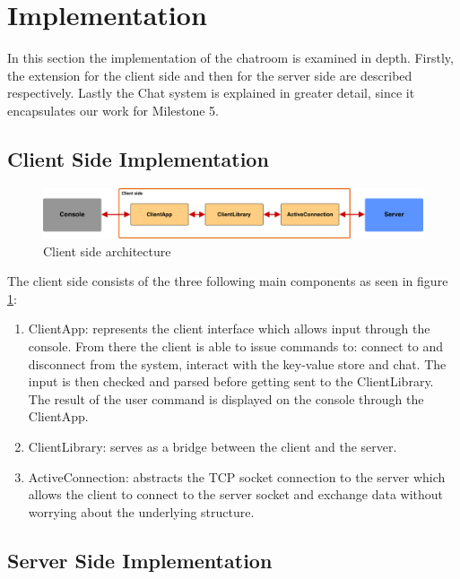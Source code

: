 \section{Implementation}
\label{sec:implementation}

In this section the implementation of the chatroom is examined in depth. Firstly, the extension for the client side and then for the server side are described respectively. Lastly the Chat system is explained in greater detail, since it encapsulates our work for Milestone 5.

\subsection{Client Side Implementation}
\label{sec:Implementation_clintside}

\begin{figure}[h]
	\centering
	\includegraphics[width=\linewidth]{figures/client_arch.png}
	\caption{Client side architecture}
	\label{fig:client_arch}
\end{figure}

The client side consists of the three following main components as seen in figure \ref{fig:client_arch}:
\begin{enumerate} %
  \item ClientApp: represents the client interface which allows input through the console. From there the client is able to issue commands to: connect to and disconnect from the system, interact with the key-value store and chat. The input is then checked and parsed before getting sent to the ClientLibrary. The result of the user command is displayed on the console through the ClientApp.
  \item ClientLibrary: serves as a bridge between the client and the server.
  \item ActiveConnection: abstracts the TCP socket connection to the server which allows the client to connect to the server socket and exchange data without worrying about the underlying structure.
\end{enumerate}
 
\subsection{Server Side Implementation}
\label{sec:implementation_serverside}

